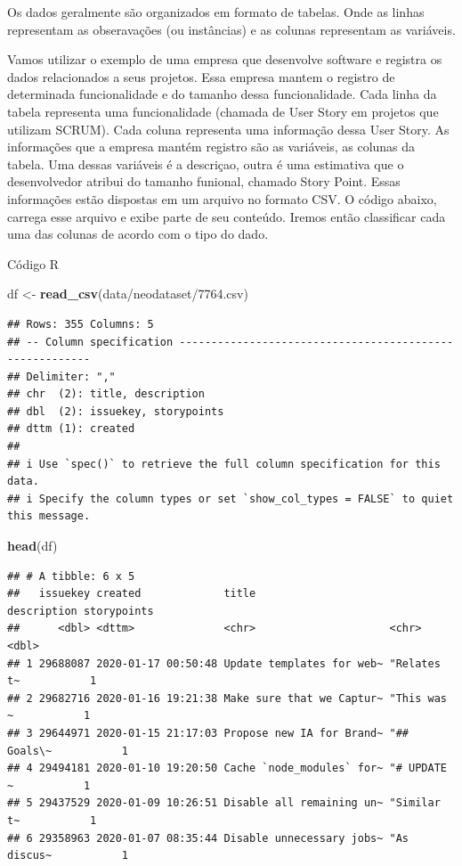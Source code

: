 \documentclass[
]{book}
\newenvironment{Shaded}{\begin{snugshade}}{\end{snugshade}}
\newcommand{\FunctionTok}[1]{\textcolor[rgb]{0.13,0.29,0.53}{\textbf{#1}}}
\newcommand{\NormalTok}[1]{#1}
\newcommand{\OtherTok}[1]{\textcolor[rgb]{0.56,0.35,0.01}{#1}}
\newcommand{\StringTok}[1]{\textcolor[rgb]{0.31,0.60,0.02}{#1}}
\begin{document}
Os dados geralmente são organizados em formato de tabelas. Onde as linhas representam as obseravações (ou instâncias) e as colunas representam as variáveis.

Vamos utilizar o exemplo de uma empresa que desenvolve software e registra os dados relacionados a seus projetos. Essa empresa mantem o registro de determinada funcionalidade e do tamanho dessa funcionalidade. Cada linha da tabela representa uma funcionalidade (chamada de User Story em projetos que utilizam SCRUM). Cada coluna representa uma informação dessa User Story. As informações que a empresa mantém registro são as variáveis, as colunas da tabela. Uma dessas variáveis é a descriçao, outra é uma estimativa que o desenvolvedor atribui do tamanho funional, chamado Story Point. Essas informações estão dispostas em um arquivo no formato CSV. O código abaixo, carrega esse arquivo e exibe parte de seu conteúdo. Iremos então classificar cada uma das colunas de acordo com o tipo do dado.

Código R

\begin{Shaded}
\begin{Highlighting}[]
\NormalTok{df }\OtherTok{\textless{}{-}} \FunctionTok{read\_csv}\NormalTok{(}\StringTok{\textquotesingle{}data/neodataset/7764.csv\textquotesingle{}}\NormalTok{)}
\end{Highlighting}
\end{Shaded}

\begin{verbatim}
## Rows: 355 Columns: 5
## -- Column specification --------------------------------------------------------
## Delimiter: ","
## chr  (2): title, description
## dbl  (2): issuekey, storypoints
## dttm (1): created
## 
## i Use `spec()` to retrieve the full column specification for this data.
## i Specify the column types or set `show_col_types = FALSE` to quiet this message.
\end{verbatim}

\begin{Shaded}
\begin{Highlighting}[]
\FunctionTok{head}\NormalTok{(df)}
\end{Highlighting}
\end{Shaded}

\begin{verbatim}
## # A tibble: 6 x 5
##   issuekey created             title                     description storypoints
##      <dbl> <dttm>              <chr>                     <chr>             <dbl>
## 1 29688087 2020-01-17 00:50:48 Update templates for web~ "Relates t~           1
## 2 29682716 2020-01-16 19:21:38 Make sure that we Captur~ "This was ~           1
## 3 29644971 2020-01-15 21:17:03 Propose new IA for Brand~ "## Goals\~           1
## 4 29494181 2020-01-10 19:20:50 Cache `node_modules` for~ "# UPDATE ~           1
## 5 29437529 2020-01-09 10:26:51 Disable all remaining un~ "Similar t~           1
## 6 29358963 2020-01-07 08:35:44 Disable unnecessary jobs~ "As discus~           1
\end{verbatim}
\end{document}

